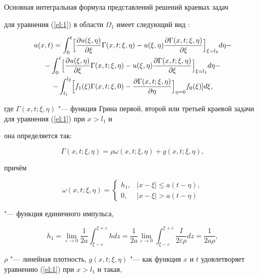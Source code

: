 Основная интегральная формула представлений решений краевых задач

для уравнения (\ref{el:1}) в области $\Omega_1$ имеет следующий вид \cite{eleevbalk:bib:Pol}:

\begin{multline} \label{el:49}

u(x,t)=\int_0^t\Bigl[\frac{\partial

u(\xi,\eta)}{\partial\xi}\Gamma(x,t;\xi,\eta)-u(\xi,\eta)\frac{\partial\Gamma(x,t;\xi,\eta)}{\partial\xi}\Bigr]_{\xi=l_2}d\eta-\\

-\int_0^t\Bigl[\frac{\partial

u(\xi,\eta)}{\partial\xi}\Gamma(x,t;\xi,\eta)-u(\xi,\eta)\frac{\partial\Gamma(x,t;\xi,\eta)}{\partial\xi}\Bigr]_{\xi=l_1}d\eta-\\

-\int_{l_1}^{l_2}\Bigl[f_1(\xi)\Gamma(x,t;\xi,0)-\frac{\partial\Gamma(x,t;\xi,\eta)}{\partial\eta}\Bigr]_{\eta=0}f_0(\xi)]d\xi,

\end{multline}

где $\Gamma(x,t;\xi,\eta)$ "--- функция Грина первой, второй или третьей краевой задачи для уравнения (\ref{el:1}) при $x>l_1$ и 

она определяется так:

$$\Gamma(x,t;\xi,\eta)=\rho\omega(x,t;\xi,\eta)+g(x,t;\xi,\eta),$$

причём

$$

{\omega(x,t;\xi,\eta)} =

\begin{cases}

h_1, & |x-\xi|\leq a(t-\eta), \\

0,   & |x-\xi|>a(t-\eta)

\end{cases}

$$

"--- функция единичного импульса,

$$

h_1= \lim_{\varepsilon\to

0}\frac{1}{2a}\int_{\xi-\varepsilon}^{\xi+\varepsilon}hdz=\frac{1}{2a}\lim_{\varepsilon\to

0}\int_{\xi-\varepsilon}^{\xi+\varepsilon}\frac{I}{2\varepsilon\rho}dz=\frac{1}{2a\rho},

$$

$\rho$ "--- линейная плотность, $g(x,t;\xi,\eta)$ "--- как функция $x$ и $t$ удовлетворяет уравнению (\ref{el:1}) при $x>l_1$ и такая, 

